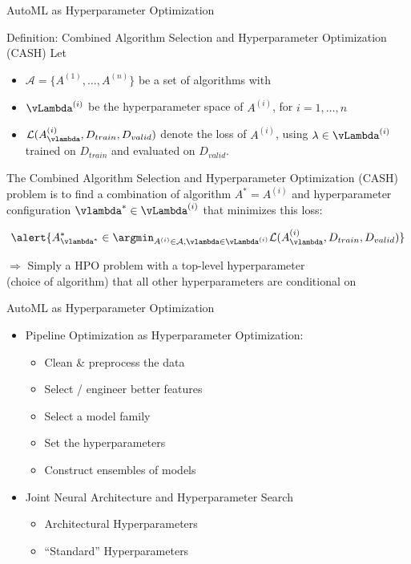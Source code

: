 {
	\begin{frame}[c]{AutoML as Hyperparameter Optimization}
	
	\begin{block}{Definition: Combined Algorithm Selection and Hyperparameter Optimization (CASH)}
		Let
		\begin{itemize}
			\item $\mathcal{A} = \{ A^{(1)}, \dots, A^{(n)} \}$ be a set of algorithms with
			\item $\vLambda^{(i)}$ be the hyperparameter space of $A^{(i)}$, for $i=1, \dots, n$
			\item \alert{$\mathcal{L}(A^{(i)}_{\vlambda}, D_{train}, D_{valid})$} denote the loss of $A^{(i)}$, using $\lambda \in \vLambda^{(i)}$ trained on $D_{train}$ and evaluated on $D_{valid}$.
		\end{itemize}
		The \alert{Combined Algorithm Selection and Hyperparameter Optimization (CASH)} problem is to find a combination of algorithm $A^*=A^{(i)}$ and hyperparameter configuration $\vlambda^* \in \vLambda^{(i)}$ that minimizes this loss:
		
		\begin{equation}
		\alert{A^*_{\vlambda^*} \in \argmin_{A^{(i)} \in \mathcal{A}, \vlambda \in \vLambda^{(i)}} \mathcal{L}(A^{(i)}_{\vlambda}, D_{train}, D_{valid})} \nonumber 
		\end{equation}
		
	\end{block}
$\Rightarrow$ Simply a HPO problem with a top-level hyperparameter\\
(choice of algorithm) that all other hyperparameters are conditional on
\end{frame}
}
\begin{frame}[c]{AutoML as Hyperparameter Optimization}
\begin{itemize}
	\item Pipeline Optimization as Hyperparameter Optimization:
	\begin{itemize}
		\item Clean \& preprocess the data
		\item Select / engineer better features
		\item Select a model family
		\item Set the hyperparameters
		\item Construct ensembles of models
	\end{itemize}
	\item Joint Neural Architecture and Hyperparameter Search
	\begin{itemize}
		\item Architectural Hyperparameters
		\item “Standard” Hyperparameters
	\end{itemize}
\end{itemize}
\end{frame}
